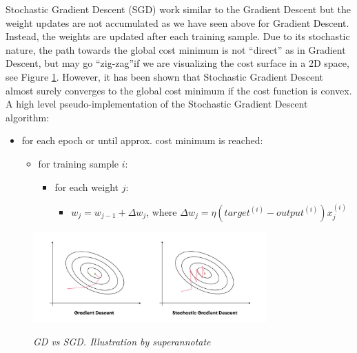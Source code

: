 Stochastic Gradient Descent (SGD) work similar to the Gradient Descent but the
weight updates are not accumulated as we have seen above for Gradient Descent.
Instead, the weights are updated after each training sample. Due to its
stochastic nature, the path towards the global cost minimum is not “direct” as
in Gradient Descent, but may go “zig-zag”if we are visualizing the cost surface
in a 2D space, see Figure \ref{fig:sgdvsgd}. However, it has been shown that
Stochastic Gradient Descent almost surely converges to the global cost minimum
if the cost function is convex. \\

A high level pseudo-implementation of the Stochastic Gradient Descent
algorithm:

\begin{itemize}[label=$\circ$]
  \item for each epoch or until approx. cost minimum is reached:
    \begin{itemize}[label=$\circ$, topsep=0pt]
      \item for training sample \(i\):
        \begin{itemize}[label=$\circ$, topsep=5pt]
          \item for each weight \(j\):
            \begin{itemize}[label=$\circ$, topsep=10pt]
              \item \(w_j = w_{j-1} + \Delta w_j\), where \(\Delta w_j = \eta (target^{(i)} - output^{(i)})x_{j}^{(i)}\)
            \end{itemize}
        \end{itemize}
    \end{itemize}
\end{itemize}

\begin{figure}[H]
  \centering
    \includegraphics[width=0.8\textwidth]{imatges/preliminaries/sgdvsgd.jpeg}
  \caption[GD vs SGD]{\textit{GD vs SGD. Illustration by superannotate}}
  {\label{fig:sgdvsgd}}
\end{figure}

